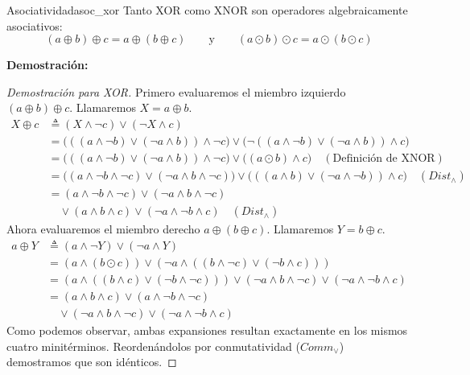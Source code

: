 \documentclass[12pt,a4paper]{article}
\newcommand{\desplegable}[2]{%
  \par\vspace{1ex}\noindent
  \textbf{Demostración:}
  \vspace{1ex}
  
  #2
  \par\vspace{1ex}
}
\begin{document}
\begin{teorema}{Asociatividad}{asoc_xor}
Tanto XOR como XNOR son operadores algebraicamente asociativos:
\[ (a \oplus b) \oplus c = a \oplus (b \oplus c) \qquad \text{y} \qquad (a \odot b) \odot c = a \odot (b \odot c) \]
\end{teorema}
\desplegable{proof_asoc_xor}{
\begin{proof}[Demostración para XOR]
Primero evaluaremos el miembro izquierdo $(a \oplus b) \oplus c$. Llamaremos $X = a \oplus b$.
\begin{align*}
    X \oplus c &\triangleq (X \wedge \neg c) \vee (\neg X \wedge c) \\
               &= \big( ((a \wedge \neg b) \vee (\neg a \wedge b)) \wedge \neg c \big) \vee \big( \neg ((a \wedge \neg b) \vee (\neg a \wedge b)) \wedge c \big) \\
               &= \big( ((a \wedge \neg b) \vee (\neg a \wedge b)) \wedge \neg c \big) \vee \big( (a \odot b) \wedge c \big) \quad (\text{Definición de XNOR}) \\
               &= \big( (a \wedge \neg b \wedge \neg c) \vee (\neg a \wedge b \wedge \neg c) \big) \vee \big( ((a \wedge b) \vee (\neg a \wedge \neg b)) \wedge c \big) \quad (Dist_\wedge) \\
               &= (a \wedge \neg b \wedge \neg c) \vee (\neg a \wedge b \wedge \neg c) \\
               &\quad \vee (a \wedge b \wedge c) \vee (\neg a \wedge \neg b \wedge c) \quad (Dist_\wedge)
\end{align*}
Ahora evaluaremos el miembro derecho $a \oplus (b \oplus c)$. Llamaremos $Y = b \oplus c$.
\begin{align*}
    a \oplus Y &\triangleq (a \wedge \neg Y) \vee (\neg a \wedge Y) \\
               &= (a \wedge (b \odot c)) \vee (\neg a \wedge ((b \wedge \neg c) \vee (\neg b \wedge c))) \\
               &= (a \wedge ((b \wedge c) \vee (\neg b \wedge \neg c))) \vee (\neg a \wedge b \wedge \neg c) \vee (\neg a \wedge \neg b \wedge c) \\
               &= (a \wedge b \wedge c) \vee (a \wedge \neg b \wedge \neg c) \\
               &\quad \vee (\neg a \wedge b \wedge \neg c) \vee (\neg a \wedge \neg b \wedge c)
\end{align*}
Como podemos observar, ambas expansiones resultan exactamente en los mismos cuatro minitérminos. Reordenándolos por conmutatividad ($Comm_\vee$) demostramos que son idénticos.
\end{proof}
}
\end{document}
